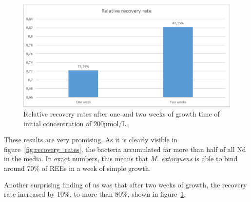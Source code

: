 \begin{figure}[H]
    \centering
    \includegraphics[width=1\textwidth]{media/images/recovery_rates_relative}
    \caption{Relative recovery rates after one and two weeks of growth time of initial concentration of 200µmol/L.}
    \label{fig:relative_rec_rates}
\end{figure}

These results are very promising.
As it is clearly visible in figure~\ref{fig:recovery_rates}, the bacteria accumulated far more than half of all Nd in the media.
In exact numbers, this means that \emph{M. extorquens} is able to bind around 70\% of REEs in a week of simple growth.

Another surprising finding of us was that after two weeks of growth, the recovery rate increased by 10\%, to more than 80\%, shown in figure~\ref{fig:relative_rec_rates}.
